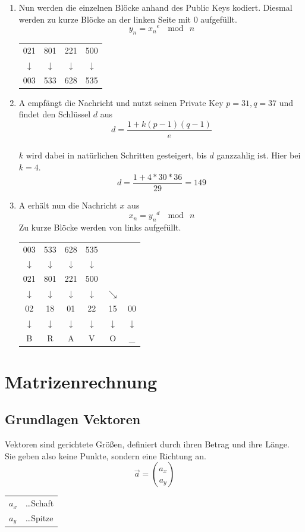 \documentclass{school}
\begin{document}
\begin{enumerate}
    \item Nun werden die einzelnen Blöcke anhand des Public Keys kodiert. Diesmal werden zu kurze Blöcke an der linken Seite mit 0 aufgefüllt.
    $$y_n = {x_n}^e ~\mod~ n$$
    \begin{center}
        \begin{tabular}{c c c c}
            021 & 801 & 221 & 500\\
            $\downarrow$ & $\downarrow$ & $\downarrow$ & $\downarrow$\\
            003 & 533 & 628 & 535
        \end{tabular}
    \end{center}
    \item A empfängt die Nachricht und nutzt seinen Private Key $p = 31, q = 37$ und findet den Schlüssel $d$ aus
    $$d = \frac{1 + k(p-1)(q-1)}{e}$$~\\
    $k$ wird dabei in natürlichen Schritten gesteigert, bis $d$ ganzzahlig ist. Hier bei $k = 4$.
    $$d = \frac{1 + 4 * 30 * 36}{29} = 149$$
    \item A erhält nun die Nachricht $x$ aus $$x_n = {y_n}^d ~\mod~ n$$
    Zu kurze Blöcke werden von links aufgefüllt.
    \begin{center}
        \begin{tabular}{c c c c c c}
            003 & 533 & 628 & 535 & &\\
            $\downarrow$ & $\downarrow$ & $\downarrow$ & $\downarrow$ & &\\
            021 & 801 & 221 & 500 & &\\
            $\downarrow$ & $\downarrow$ & $\downarrow$ & $\downarrow$ & $\searrow$ &\\
            02 & 18 & 01 & 22 & 15 & 00\\
            $\downarrow$ & $\downarrow$ & $\downarrow$ & $\downarrow$ & $\downarrow$ & $\downarrow$\\
            B & R & A & V & O & \_
        \end{tabular}
    \end{center}
\end{enumerate}

\section{Matrizenrechnung}
\subsection{Grundlagen Vektoren}
Vektoren sind gerichtete Größen, definiert durch ihren Betrag und ihre Länge.\\
Sie geben also keine Punkte, sondern eine Richtung an.
$$\vec{a} = \binom{a_x}{a_y}$$
\begin{center}
    \begin{tabular}{l l}
        $a_x$ & \dots Schaft\\
        $a_y$ & \dots Spitze\\
    \end{tabular}
\end{center}
\end{document}
